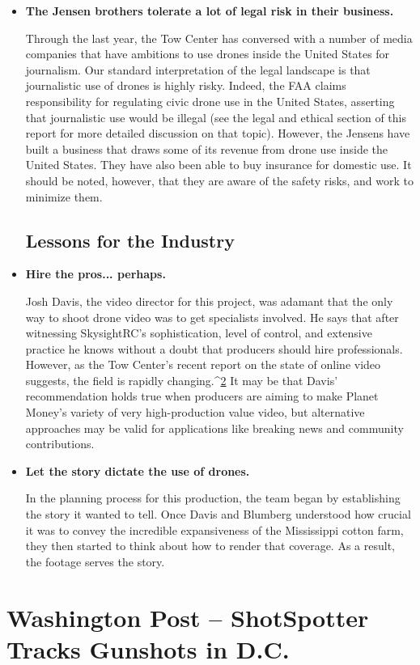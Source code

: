 \begin{itemize}
\item \textbf{The Jensen brothers tolerate a lot of legal risk in their business.}

Through the last year, the Tow Center has conversed with a number
of media companies that have ambitions to use drones inside the
United States for journalism. Our standard interpretation of the legal
landscape is that journalistic use of drones is highly risky. Indeed,
the FAA claims responsibility for regulating civic drone use in the
United States, asserting that journalistic use would be illegal (see the
legal and ethical section of this report for more detailed discussion
on that topic). However, the Jensens have built a business that draws
some of its revenue from drone use inside the United States. They
have also been able to buy insurance for domestic use. It should be
noted, however, that they are aware of the safety risks, and work to
minimize them.

\section{Lessons for the Industry}
\item \textbf{Hire the pros... perhaps.}

Josh Davis, the video director for this project, was adamant that the
only way to shoot drone video was to get specialists involved. He says
that after witnessing SkysightRC's sophistication, level of control, and
extensive practice he knows without a doubt that producers should
hire professionals. However, as the Tow Center's recent report on the
state of online video suggests, the field is rapidly changing.^{\href{#endnotes-planet-money}{2}} It may be
that Davis' recommendation holds true when producers are aiming to
make Planet Money's variety of very high-production value video, but
alternative approaches may be valid for applications like breaking
news and community contributions.

\item \textbf{Let the story dictate the use of drones.}

In the planning process for this production, the team began by establishing
the story it wanted to tell. Once Davis and Blumberg understood
how crucial it was to convey the incredible expansiveness of
the Mississippi cotton farm, they then started to think about how to
render that coverage. As a result, the footage serves the story.
\end{itemize}

\chapter{Washington Post – ShotSpotter Tracks Gunshots in D.C.}

